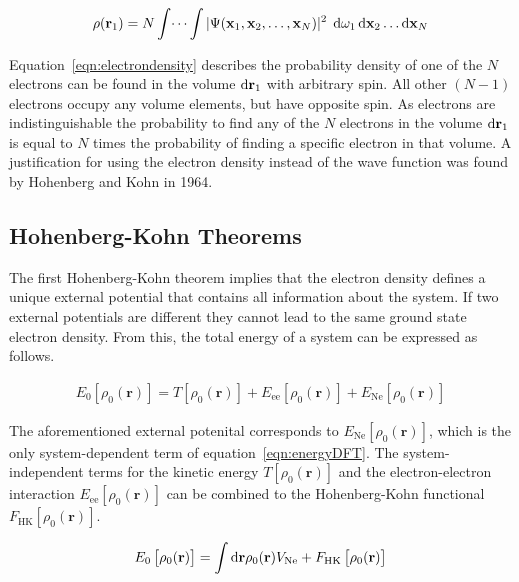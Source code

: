 \begin{align}
    \rho(\mathbf{r}_1)=N\int\dots\int|\Psi(\mathbf{x}_1,\mathbf{x}_2,\dots,\mathbf{x}_N)|^2\;\dif\omega_1\dif\mathbf{x}_2\dots\dif\mathbf{x}_N\label{eqn:electrondensity}
\end{align}

Equation~\eqref{eqn:electrondensity} describes the probability density of one
of the $N$ electrons can be found in the volume $\dif \mathbf{r}_1$ with
arbitrary spin. All other $(N-1)$ electrons occupy any volume elements, but
have opposite spin. As electrons are indistinguishable the probability to find
any of the $N$ electrons in the volume $\dif\mathbf{r}_1$ is equal to $N$ times
the probability of finding a specific electron in that volume.  A justification
for using the electron density instead of the wave function was found by
Hohenberg and Kohn in 1964.

\subsection{Hohenberg-Kohn Theorems}
\label{sec:HKtheorems}

The first Hohenberg-Kohn theorem implies that the electron density defines a
unique external potential that contains all information about the system. If
two external potentials are different they cannot lead to the same ground state
electron density. From this, the total energy of a system can be expressed as follows.

\begin{align}
    E_0\left[ \rho_0(\mathbf{r}) \right] = T\left[ \rho_0(\mathbf{r}) \right] + E_\text{ee} \left[ \rho_0(\mathbf{r}) \right] + E_\text{Ne} \left[ \rho_0(\mathbf{r}) \right]\label{eqn:energyDFT}
\end{align}

The aforementioned external potenital corresponds to $E_\text{Ne} \left[
    \rho_0(\mathbf{r}) \right]$, which is the only system-dependent term of
equation~\eqref{eqn:energyDFT}. The system-independent terms for the kinetic
energy $T\left[ \rho_0(\mathbf{r}) \right]$ and the electron-electron
interaction $E_\text{ee} \left[ \rho_0(  \mathbf{r}) \right]$ can be combined
to the Hohenberg-Kohn functional $F_\text{HK}\left[ \rho_0(
\mathbf{r})\right]$.

\begin{align}
    E_0\left[ \rho_0(\mathbf{r}) \right] = \int\dif\mathbf{r}\rho_0(\mathbf{r})V_\text{Ne}+ F_\text{HK}\left[ \rho_0(\mathbf{r})\right]\label{eqn:energyDFTHK}
\end{align}

